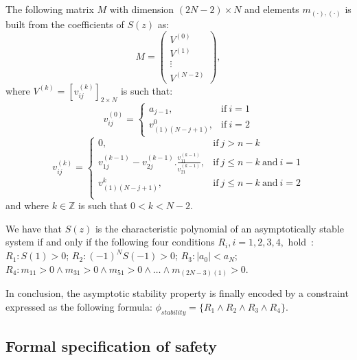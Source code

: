 The following matrix $M$ with dimension $(2N-2)\times N$ and elements $m_{(\cdot),(\cdot)}$ is built from the coefficients of $S(z)$ as:  
%
$$
M=\left( 
\begin{array}{c}
V^{(0)}\\
V^{(1)}\\
\vdots\\
V^{(N-2)}
\end{array}
\right), 
$$
%
where $V^{(k)} = [v^{(k)}_{ij} ]_{2\times N}$ is such that:
%
$$
v_{ij}^{(0)}=\left\{
\begin{array}{ll}
a_{j-1}, & \mbox{if}~i=1\\
v_{(1)(N-j+1)}^{0},&\mbox{if}~i=2
\end{array}
\right.
$$
%
$$
v_{ij}^{(k)}=\left\{
\begin{array}{ll}
0,&\mbox{if}~j>n-k\\
v_{1j}^{(k-1)}-v_{2j}^{(k-1)} . \frac{v_{11}^{(k-1)}}{v_{21}^{(k-1)}}, & \mbox{if}~j\leq n-k ~\mbox{and}~i=1\\
v_{(1)(N-j+1)}^{k},& \mbox{if}~j\leq n-k ~\mbox{and}~i=2\\
\end{array}
\right.
$$
%
and where $k \in \mathbb{Z}$ is such that $0 < k < N - 2$.  

We have that $S(z)$ is the characteristic polynomial of an asymptotically stable system if and only if the following four conditions $R_i, i = 1,2,3,4,$ hold~\cite{astrom1997computer}: 
$R_1: S(1) > 0$;
$R_2: (-1)^N S(-1) > 0$;
$R_3: |a_0| < a_N$;
$R_4: m_{11} > 0 \wedge\allowbreak
      m_{31}>0 \wedge\allowbreak
      m_{51}>0 \wedge \ldots \wedge\allowbreak
      m_{(2N{-}3)(1)}>0$.

In conclusion, 
the asymptotic stability property is finally encoded by a constraint expressed as the following formula: 
$
\phi_\mathit{stability} = \{R_1 \wedge R_2 \wedge R_3 \wedge R_4\}.
$

\ifx\safetyrep
\subsection{Formal specification of safety} 
\label{ssec:safespecification}

